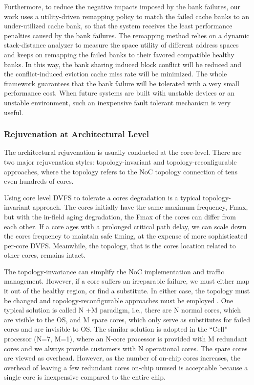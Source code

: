Furthermore, to reduce the negative impacts imposed by the bank failures, our work uses a utility-driven remapping policy to match the failed cache banks to an under-utilized cache bank, so that the system receives the least performance penalties caused by the bank failures. The remapping method relies on a dynamic stack-distance analyzer to measure the space utility of different address spaces and keeps on remapping the failed banks to their favored compatible healthy banks. In this way, the bank sharing induced block conflict will be reduced and the conflict-induced eviction cache miss rate will be minimized. The whole framework guarantees that the bank failure will be tolerated with a very small performance cost. When future systems are built with unstable devices or an unstable environment, such an inexpensive fault tolerant mechanism is very useful.

\subsubsection{Rejuvenation at Architectural Level}
The architectural rejuvenation is usually conducted at the core-level. There are two major rejuvenation styles: topology-invariant and topology-reconfigurable approaches, where the topology refers to the NoC topology connection of tens even hundreds of cores. 

Using core level DVFS to tolerate a cores degradation is a typical topology-invariant approach. The cores initially have the same maximum frequency, Fmax, but with the in-field aging degradation, the Fmax of the cores can differ from each other. If a core ages with a prolonged critical path delay, we can scale down the cores frequency to maintain safe timing, at the expense of more sophisticated per-core DVFS. Meanwhile, the topology, that is the cores location related to other cores, remains intact. 

The topology-invariance can simplify the NoC implementation and traffic management. However, if a core suffers an irreparable failure, we must either map it out of the healthy region, or find a substitute. In either case, the topology must be changed and topology-reconfigurable approaches must be employed \cite{fu2011abacus} \cite{zhang2009topology}. One typical solution is called N +M paradigm, i.e., there are N normal cores, which are visible to the OS, and M spare cores, which only serve as substitutes for failed cores and are invisible to OS. The similar solution is adopted in the “Cell” processor (N=7, M=1), where an N-core processor is provided with M redundant cores and we always provide customers with N operational cores. The spare cores are viewed as overhead. However, as the number of on-chip cores increases, the overhead of leaving a few redundant cores on-chip unused is acceptable because a single core is inexpensive compared to the entire chip. 

